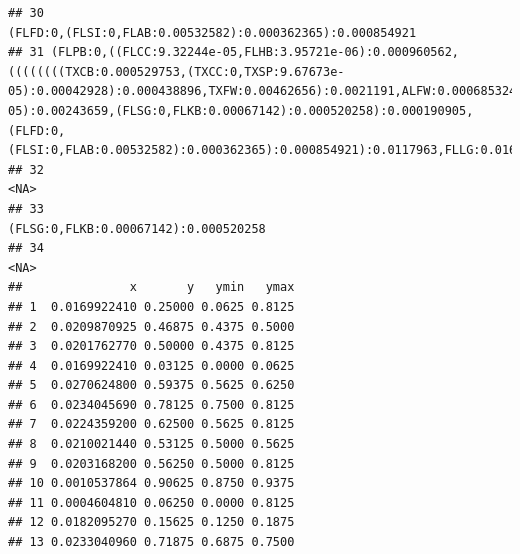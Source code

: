 \documentclass[]{article}
\begin{document}
\begin{verbatim}
## 30                                                                                                                                                                                                                                                                                                                                                       (FLFD:0,(FLSI:0,FLAB:0.00532582):0.000362365):0.000854921
## 31 (FLPB:0,((FLCC:9.32244e-05,FLHB:3.95721e-06):0.000960562,((((((((TXCB:0.000529753,(TXCC:0,TXSP:9.67673e-05):0.00042928):0.000438896,TXFW:0.00462656):0.0021191,ALFW:0.000685324):0.000140543,LAFW:0.000833551):0.000556541,ALST:7.75698e-05):0.00243659,(FLSG:0,FLKB:0.00067142):0.000520258):0.000190905,(FLFD:0,(FLSI:0,FLAB:0.00532582):0.000362365):0.000854921):0.0117963,FLLG:0.0165317):0.000460481):0);
## 32                                                                                                                                                                                                                                                                                                                                                                                                            <NA>
## 33                                                                                                                                                                                                                                                                                                                                                                            (FLSG:0,FLKB:0.00067142):0.000520258
## 34                                                                                                                                                                                                                                                                                                                                                                                                            <NA>
##               x       y   ymin   ymax
## 1  0.0169922410 0.25000 0.0625 0.8125
## 2  0.0209870925 0.46875 0.4375 0.5000
## 3  0.0201762770 0.50000 0.4375 0.8125
## 4  0.0169922410 0.03125 0.0000 0.0625
## 5  0.0270624800 0.59375 0.5625 0.6250
## 6  0.0234045690 0.78125 0.7500 0.8125
## 7  0.0224359200 0.62500 0.5625 0.8125
## 8  0.0210021440 0.53125 0.5000 0.5625
## 9  0.0203168200 0.56250 0.5000 0.8125
## 10 0.0010537864 0.90625 0.8750 0.9375
## 11 0.0004604810 0.06250 0.0000 0.8125
## 12 0.0182095270 0.15625 0.1250 0.1875
## 13 0.0233040960 0.71875 0.6875 0.7500

\end{verbatim}
\end{document}
